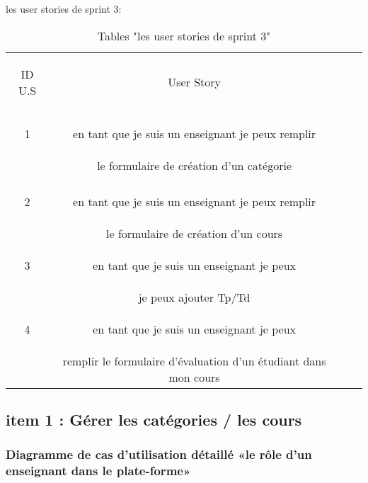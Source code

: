 \begin{table}[h]
	{\Large\color{cyan} les user stories de sprint 3:}\\
	
	\begin{center}
		\begin{tabular}{>{\begin{bf} } c <{\end{bf}}ccc}
			
			\rowcolor{-blue!20!red}ID U.S & \begin{bf}User Story \end{bf}  & \\
			
			1 &en tant que je suis un enseignant je peux remplir   \\
		& le formulaire  de création d'un catégorie
		\\
			& \\	2 &en tant que je suis un enseignant je peux remplir   \\
			& le formulaire  de création d'un cours
			\\
			3 & en tant que je suis un enseignant je peux \\
			& je peux ajouter Tp/Td 
			\\
				4 & en tant que je suis un enseignant je peux \\
			&  remplir le formulaire d'évaluation d'un étudiant dans mon cours
			\\
			
			
			
		\end{tabular}
	\end{center}
	\caption{Tables  "les user stories de sprint 3"}
	\label{les user stories de sprint 3}
\end{table}


\clearpage

\clearpage
\subsection{item 1 : Gérer les catégories / les cours}

\subsubsection{Diagramme de cas d’utilisation  détaillé «le rôle d'un enseignant dans le plate-forme» }

